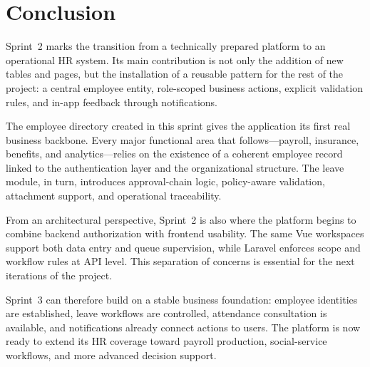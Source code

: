 \section{Conclusion}\label{sec:s2_conclusion}

Sprint~2 marks the transition from a technically prepared platform to an operational HR system.
Its main contribution is not only the addition of new tables and pages, but the installation of a
reusable pattern for the rest of the project: a central employee entity, role-scoped business
actions, explicit validation rules, and in-app feedback through notifications.

The employee directory created in this sprint gives the application its first real business
backbone. Every major functional area that follows---payroll, insurance, benefits, and
analytics---relies on the existence of a coherent employee record linked to the authentication
layer and the organizational structure. The leave module, in turn, introduces approval-chain
logic, policy-aware validation, attachment support, and operational traceability.

From an architectural perspective, Sprint~2 is also where the platform begins to combine backend
authorization with frontend usability. The same Vue workspaces support both data entry and queue
supervision, while Laravel enforces scope and workflow rules at API level. This separation of
concerns is essential for the next iterations of the project.

Sprint~3 can therefore build on a stable business foundation: employee identities are
established, leave workflows are controlled, attendance consultation is available, and
notifications already connect actions to users. The platform is now ready to extend its HR
coverage toward payroll production, social-service workflows, and more advanced decision support.

